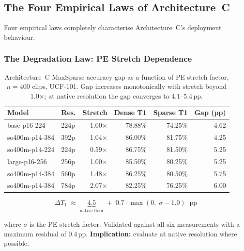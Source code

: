 \documentclass{article}
\begin{document}
\subsection{The Four Empirical Laws of Architecture~C}
\label{sec:four-laws}

Four empirical laws completely characterise Architecture~C's deployment
behaviour.

\subsubsection{The Degradation Law: PE Stretch Dependence}
\label{sec:degradation-law}

\begin{table}[htbp]
\centering
\setlength{\tabcolsep}{4.5pt}
\renewcommand{\arraystretch}{1.12}
\begin{tabular}{llrrrr}
\toprule
\textbf{Model} & \textbf{Res.} & \textbf{Stretch}
  & \textbf{Dense T1} & \textbf{Sparse T1} & \textbf{Gap (pp)} \\
\midrule
base-p16-224   & 224p & 1.00$\times$ & 78.88\% & 74.25\% & 4.62 \\
so400m-p14-384 & 392p & 1.04$\times$ & 86.00\% & 81.75\% & 4.25 \\
so400m-p14-224 & 224p & 0.59$\times$ & 86.75\% & 81.50\% & 5.25 \\
large-p16-256  & 256p & 1.00$\times$ & 85.50\% & 80.25\% & 5.25 \\
so400m-p14-384 & 560p & 1.48$\times$ & 86.25\% & 80.50\% & 5.75 \\
so400m-p14-384 & 784p & 2.07$\times$ & 82.25\% & 76.25\% & 6.00 \\
\bottomrule
\end{tabular}
\caption{Architecture~C MaxSparse accuracy gap as a function of PE stretch
factor, $n = 400$ clips, UCF-101. Gap increases monotonically with stretch
beyond 1.0$\times$; at native resolution the gap converges to 4.1--5.4\,pp.}
\label{tab:degradation-law}
\end{table}

\begin{equation}
\label{eq:degradation-law}
\Delta T_1 \;\approx\; \underbrace{4.5}_{\text{native floor}} \;+\;
  0.7 \cdot \max(0,\; \sigma - 1.0)\;\;\text{pp}
\end{equation}

where $\sigma$ is the PE stretch factor. Validated against all six
measurements with a maximum residual of 0.4\,pp.
\textbf{Implication:} evaluate at native resolution where possible.
\end{document}

